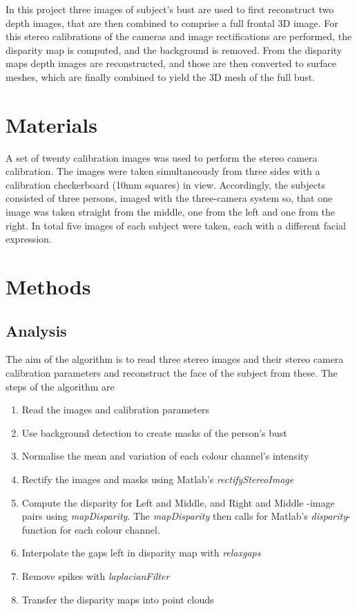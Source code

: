 \documentclass[journal]{IEEEtran}
\begin{document}
In this project three images of subject's bust are used to first reconstruct two depth images, that are then combined to comprise a full frontal 3D image.
For this stereo calibrations of the cameras and image rectifications are performed, the disparity map is computed, and the background is removed.
From the disparity maps depth images are reconstructed, and those are then converted to surface meshes, which are finally combined to yield the 3D mesh of the full bust.


\section{Materials}
A set of twenty calibration images was used to perform the stereo camera calibration. 
The images were taken simultaneously from three sides with a calibration checkerboard (10mm squares) in view.
Accordingly, the subjects consisted of three persons, imaged with the three-camera system so, that one image was taken straight from the middle, one from the left and one from the right. 
In total five images of each subject were taken, each with a different facial expression.


\section{Methods}

\subsection{Analysis}

The aim of the algorithm is to read three stereo images and their stereo camera calibration parameters and reconstruct the face of the subject from these.
The steps of the algorithm are 

\begin{enumerate}
\item Read the images and calibration parameters
\item Use background detection to create masks of the person's bust
\item Normalise the mean and variation of each colour channel's intensity
\item Rectify the images and masks using Matlab's \textit{rectifyStereoImage}
\item Compute the disparity for Left and Middle, and Right and Middle -image pairs using \textit{mapDisparity}. The \textit{mapDisparity} then calls for Matlab's \textit{disparity}-function for each colour channel.
\item Interpolate the gaps left in disparity map with \textit{relaxgaps}
\item Remove spikes with \textit{laplacianFilter}
\item Transfer the disparity maps into point clouds

\end{enumerate}
\end{document}
